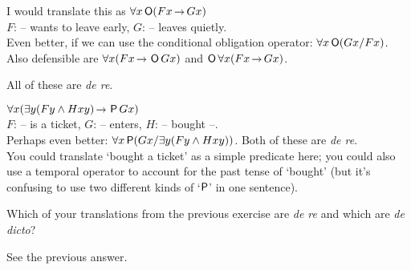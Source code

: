 \begin{solution}
\begin{sollist}
  \item %
    I would translate this as $\forall x \Ob(Fx \to Gx)$\\
    $F$: -- wants to leave early, $G$: -- leaves quietly.\\[1mm]
    Even better, if we can use the conditional obligation operator: $\forall x \operatorname{\mathsf{O}}(Gx / Fx)$. Also defensible are
    $\forall x (Fx \to \Ob Gx)$ and $\Ob\forall x(Fx \to Gx)$.

    All of these are \emph{de re}. \\[-2mm]
    
  \item %

    $\forall x (\exists y (Fy \land Hxy) \to \Pe Gx)$\\
    $F$: -- is a ticket, $G$: -- enters, $H$: -- bought --.\\[1mm]
    Perhaps even better: $\forall x \operatorname{\mathsf{P}}(Gx/ \exists y (Fy \land Hxy))$.
    Both of these are \emph{de re}.\\[1mm]
    You could translate `bought a ticket' as a simple predicate here;
    you could also use a temporal operator to account for the past
    tense of `bought' (but it's confusing to use two different kinds
    of `$\operatorname{\mathsf{P}}$' in one sentence).
    \\[-2mm]

  \end{sollist}
\end{solution}

\begin{exercise}
  Which of your translations from the previous exercise are \emph{de
    re} and which are \emph{de dicto}?
\end{exercise}
\begin{solution}
  See the previous answer.
\end{solution}

